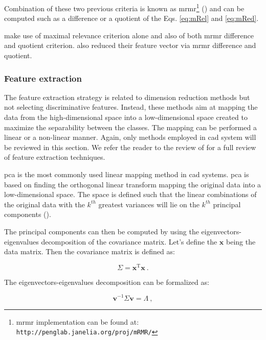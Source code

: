 Combination of these two previous criteria is known as \ac{mrmr}\footnote{\ac{mrmr} implementation can be found at: \texttt{http://penglab.janelia.\allowbreak org/proj/mRMR/}} (\cite{Peng2005}) and can be computed such as a difference or a quotient of the Eqs. \eqref{eq:mRel} and \eqref{eq:mRed}.

\cite{Niaf2011,Niaf2012} make use of maximal relevance criterion alone and also of both \ac{mrmr} difference and quotient criterion. \cite{Viswanath2012} also reduced their feature vector via \ac{mrmr} difference and quotient.

\subsubsection{Feature extraction}

The feature extraction strategy is related to dimension reduction methods but not selecting discriminative features. Instead, these methods aim at mapping the data from the high-dimensional space into a low-dimensional space created to maximize the separability between the classes. The mapping can be performed a linear or a non-linear manner. Again, only methods employed in \ac{cad} system will be reviewed in this section. We refer the reader to the review of \cite{Fodor2002} for a full review of feature extraction techniques.

\ac{pca} is the most commonly used linear mapping method in \ac{cad} systems. \ac{pca} is based on finding the orthogonal linear transform mapping the original data into a low-dimensional space. The space is defined such that the linear combinations of the original data with the $k^{th}$ greatest variances will lie on the $k^{th}$ principal components (\cite{Jolliffe2002}).

The principal components can then be computed by using the eigenvectors-eigenvalues decomposition of the covariance matrix. Let's define the $\mathbf{x}$ being the data matrix. Then the covariance matrix is defined as:

\begin{equation}
	\Sigma = \mathbf{x}^{\text{T}} \mathbf{x} \ .
	\label{eq:covmat}
\end{equation}

The eigenvectors-eigenvalues decomposition can be formalized as:

\begin{equation}
	\mathbf{v}^{-1} \Sigma \mathbf{v} = \Lambda \ ,
	\label{eq:eigpca}
\end{equation}

